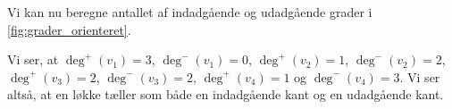 %
%
%
%
%
%
%
%
%
%


\begin{exmp} \label{ex:grader_orienteret}
Vi kan nu beregne antallet af indadgående og udadgående grader i \autoref{fig:grader_orienteret}.

Vi ser, at $\deg^{+}(v_{1})=3$, $\deg^{-}(v_{1})=0$, $\deg^{+}(v_{2})=1$, $\deg^{-}(v_{2})=2$, $\deg^{+}(v_{3})=2$, $\deg^{-}(v_{3})=2$, $\deg^{+}(v_{4})=1$ og $\deg^{-}(v_{4})=3$. Vi ser altså, at en løkke tæller som både en indadgående kant og en udadgående kant.
\end{exmp}

